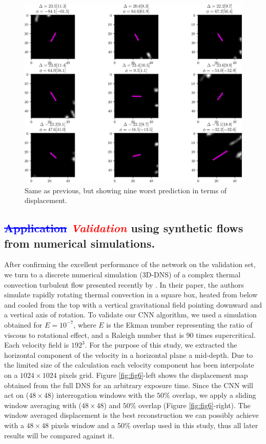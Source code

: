 \documentclass{svjour3}                     %
\newcommand{\new}[1]{\textit{\textcolor{red}{#1}}}
\newcommand{\old}[1]{\textcolor{blue}{\sout{#1}}}
\begin{document}
\begin{figure}
\includegraphics[width=\textwidth]{figs/figure4.png}
\caption{Same as previous, but showing nine worst prediction in terms of displacement.}
\label{fig:fig5}
\end{figure}

\subsection{\old{Application} \new{Validation} using synthetic flows from numerical simulations.}

After confirming the excellent performance of the network on the validation set, we turn to a discrete numerical simulation (3D-DNS) of a complex thermal convection turbulent flow presented recently by \cite{plumley2016effects}. In their paper, the authors simulate rapidly rotating thermal convection in a square box, heated from below and cooled from the top with a vertical gravitational field pointing downward and a vertical axis of rotation. To validate our CNN algorithm, we used a simulation obtained for $E=10^{-7}$, where $E$ is the Ekman number representing the ratio of viscous to rotational effect, and a Raleigh number that is 90 times supercritical. Each velocity field is $192^3$. For the purpose of this study, we extracted the horizontal component of the velocity in a horizontal plane a mid-depth. Due to the limited size of the calculation each velocity component has been interpolate on a $1024\times 1024$ pixels grid. 
Figure \ref{fig:fig6}-left shows the displacement map obtained from the full DNS for an arbitrary exposure time. Since the CNN will act on ($48\times48$) interrogation windows with the $50\%$ overlap, we apply a sliding window averaging with ($48\times48$) and $50\%$ overlap (Figure \ref{fig:fig6}-right). The window averaged displacement is the best reconstruction we can possibly achieve with a $48 \times 48$ pixels window and a 50\% overlap used in this study, thus all later results will be compared against it.
\end{document}
